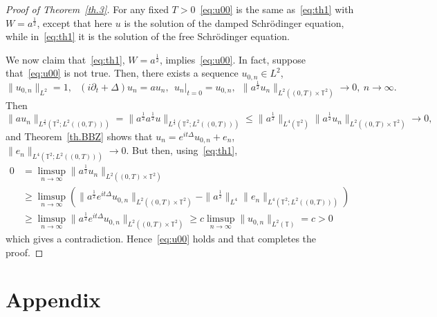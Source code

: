 \documentclass[11pt]{article}
\theoremstyle{definition}
\numberwithin{equation}{section}
\numberwithin{figure}{section}
\numberwithin{table}{section}
\newcommand{\TT}{{\mathbb T}}
\begin{document}
\begin{proof}[Proof of Theorem~\ref{th.3}]
For any fixed $T>0$~\eqref{eq:u00} is the same as~\eqref{eq:th1} with $ W = a^{\frac12} $, except that here $u$ is the solution of the damped Schrödinger equation, while in~\eqref{eq:th1} it is the solution of the free Schrödinger equation.

We now claim that~\eqref{eq:th1}, $ W = a^{\frac12} $, implies~\eqref{eq:u00}. In fact, suppose that~\eqref{eq:u00} is not true. Then, there exists a sequence $ u_{0,n} \in L^2 $,
\[
\| u_{0,n} \|_{L^2} =1, \ \ \ (i \partial_t + \Delta)u_n = a u_n, \ \ u_n|_{t=0} = u_{0,n}, \ \
\| a^{\frac12} u_n \|_{ L^2 ((0, T) \times \TT^2) } \to 0, \ n\to \infty.
\]
Then
\[
\| a u_n \|_{ L^{\frac43} (\TT^2; L^2 ((0, T))) } =
\| a^{\frac12} a^{\frac12} u \|_{ L^{\frac43} (\TT^2; L^2 ((0, T))) }
\leq \| a^{\frac12} \|_{L^4(\TT^2) }
\| a^{\frac12} u_n \|_{ L^2 ((0, T) \times \TT^2) } \to 0,
\]
and Theorem~\ref{th.BBZ} shows that $ u_n = e^{ it \Delta} u_{0,n} + e_n$, $ \| e_n \|_{ L^4 (\TT^2 ; L^2 ((0, T))) } \to 0 $. But then, using~\eqref{eq:th1},
\[
\begin{split} 0 & = \limsup_{n \to \infty } \| a^{\frac12} u_n \|_{L^2 ((0, T) \times \TT^2) }
\\ &
\geq \limsup_{n \to \infty } \left(\| a^{\frac12} e^{ it \Delta } u_{ 0,n} \|_{ L^2 ((0, T) \times \TT^2) } - \| a^{\frac12} \|_{L^4 }
\| e_n \|_{ L^4 (\TT^2 ; L^2 ((0, T))) } \right) \\
& \geq
\limsup_{n \to \infty } \| a^{\frac12} e^{ it \Delta } u_{ 0,n} \|_{ L^2 ((0, T) \times \TT^2) } \geq c
\limsup_{n\to \infty } \| u_{0,n}\|_{L^2 (\TT)} = c > 0
\end{split}
\]
which gives a contradiction. Hence~\eqref{eq:u00} holds and that completes the proof.
\end{proof}

\appendix
\section*{Appendix}
\end{document}
